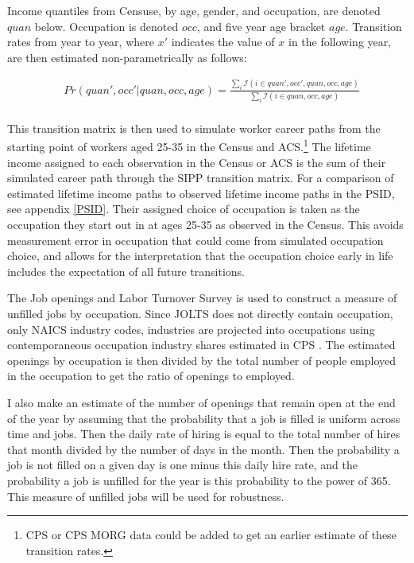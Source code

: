 \documentclass[12pt]{article}
\begin{document}
Income quantiles from Censuse, by age, gender, and occupation, are denoted $quan$ below. Occupation is denoted $occ$, and five year age bracket $age$. Transition rates from year to year, where $x'$ indicates the value of $x$ in the following year, are then estimated non-parametrically as follows:

\begin{align*}
& Pr(quan',occ'|quan,occ,age)=  \frac{\sum_{i} \mathcal{I}(i \in quan',occ',quan,occ,age)}{ \sum_{i} \mathcal{I}(i \in quan,occ,age)}\\
\end{align*}

This transition matrix is then used to simulate worker career paths from the starting point of workers aged 25-35 in the Census and ACS.\footnote{CPS or CPS MORG data could be added to get an earlier estimate of these transition rates.} The lifetime income assigned to each observation in the Census or ACS is the sum of their simulated career path through the SIPP transition matrix. For a comparison of estimated lifetime income paths to observed lifetime income paths in the PSID, see appendix \ref{PSID}. Their assigned choice of occupation is taken as the occupation they start out in at ages 25-35 as observed in the Census. This avoids measurement error in occupation that could come from simulated occupation choice, and allows for the interpretation that the occupation choice early in life includes the expectation of all future transitions.

The Job openings and Labor Turnover Survey \cite{JOLTS} is used to construct a measure of unfilled jobs by occupation. Since JOLTS does not directly contain occupation, only NAICS industry codes, industries are projected into occupations using contemporaneous occupation industry shares estimated in CPS \cite{IPUMSCPS}. The estimated openings by occupation is then divided by the total number of people employed in the occupation to get the ratio of openings to employed.

I also make an estimate of the number of openings that remain open at the end of the year by assuming that the probability that a job is filled is uniform across time and jobs. Then the daily rate of hiring is equal to the total number of hires that month divided by the number of days in the month. Then the probability a job is not filled on a given day is one minus this daily hire rate, and the probability a job is unfilled for the year is this probability to the power of 365. This measure of unfilled jobs will be used for robustness.
\end{document}
